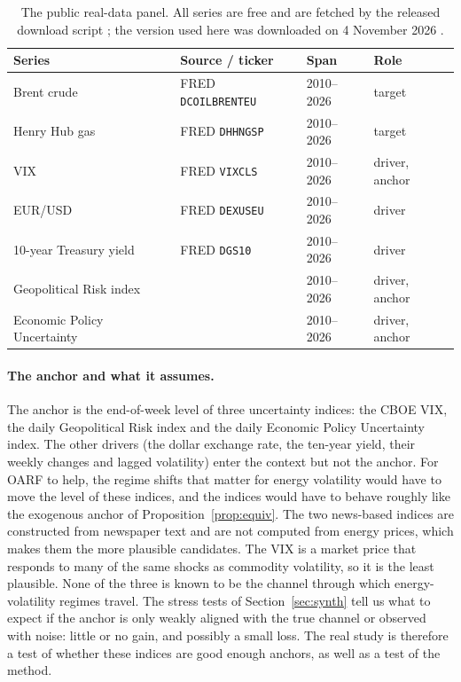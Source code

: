 \documentclass[12pt]{article}
\theoremstyle{plain}
\theoremstyle{remark}
\newcommand{\OARF}{\textsc{OARF}}
\begin{document}
\begin{table}[htbp]
\centering
\caption{The public real-data panel. All series are free and are fetched by the
released download script \citep{dang2026oarfcode}; the version used here was
downloaded on 4 November 2026 \citep{fred2026data,caldara2026gprdata,baker2026epudata}.}
\label{tab:realdata}
\small
\begin{tabular}{llll}
\toprule
Series & Source / ticker & Span & Role\\
\midrule
Brent crude & FRED \texttt{DCOILBRENTEU} & 2010--2026 & target\\
Henry Hub gas & FRED \texttt{DHHNGSP} & 2010--2026 & target\\
VIX & FRED \texttt{VIXCLS} & 2010--2026 & driver, anchor\\
EUR/USD & FRED \texttt{DEXUSEU} & 2010--2026 & driver\\
10-year Treasury yield & FRED \texttt{DGS10} & 2010--2026 & driver\\
Geopolitical Risk index & \citet{caldara2022gpr} & 2010--2026 & driver, anchor\\
Economic Policy Uncertainty & \citet{baker2016epu} & 2010--2026 & driver, anchor\\
\bottomrule
\end{tabular}
\end{table}

\paragraph{The anchor and what it assumes.}
The anchor is the end-of-week level of three uncertainty indices: the CBOE VIX, the
daily Geopolitical Risk index and the daily Economic Policy Uncertainty index. The
other drivers (the dollar exchange rate, the ten-year yield, their weekly changes and
lagged volatility) enter the context but not the anchor. For \OARF{} to help, the
regime shifts that matter for energy volatility would have to move the level of these
indices, and the indices would have to behave roughly like the exogenous anchor of
Proposition~\ref{prop:equiv}. The two news-based indices are constructed from
newspaper text and are not computed from energy prices, which makes them the more
plausible candidates. The VIX is a market price that responds to many of the same
shocks as commodity volatility, so it is the least plausible. None of the three is
known to be the channel through which energy-volatility regimes travel. The stress
tests of Section~\ref{sec:synth} tell us what to expect if the anchor is only weakly
aligned with the true channel or observed with noise: little or no gain, and possibly a
small loss. The real study is therefore a test of whether these indices are good
enough anchors, as well as a test of the method.
\end{document}
